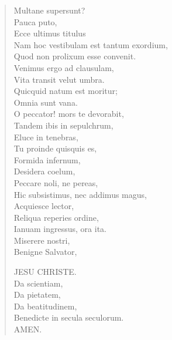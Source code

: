 \documentclass[12pt,  postvopaper]{memoir}
\begin{document}
\begin{verse}

  Multane supersunt?\\
  Pauca puto,\\
  Ecce ultimus titulus \\
  Nam hoc vestibulam est tantum exordium,\\
  Quod non prolixum esse convenit.\\
  Venimus ergo ad clausulam,\\
  Vita transit velut umbra.\\
  Quicquid natum est moritur;\\
  Omnia sunt vana.\\
  O peccator! mors te devorabit,\\
  Tandem ibis in sepulchrum,\\
  Eluce in tenebras,\\
  Tu proinde quisquis es,\\
  Formida infernum,\\
  Desidera coelum,\\
  Peccare noli, ne pereas,\\
  Hic subsistimus, nec addimus magus,\\
  Acquiesce lector,\\
  Reliqua reperies ordine,\\
  Ianuam ingressus, ora ita.\\
  Miserere nostri,\\
  Benigne Salvator,\\
  \begin{altverse}
    JESU CHRISTE.\\
    Da scientiam,\\
    Da pietatem,\\
    Da beatitudinem,\\
    Benedicte in secula seculorum.\\
    AMEN.\\
  \end{altverse}
\end{verse}
\end{document}
